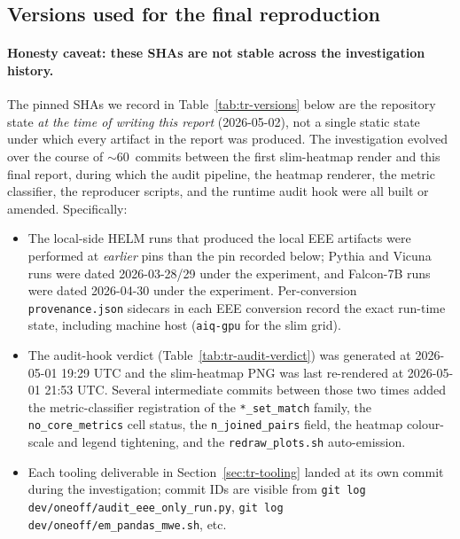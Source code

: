 \documentclass[11pt]{article}
\begin{document}
\subsection{Versions used for the final reproduction}
\label{sec:tr-versions}

\paragraph{Honesty caveat: these SHAs are not stable across the
  investigation history.}
The pinned SHAs we record in Table~\ref{tab:tr-versions} below are the
  repository state \emph{at the time of writing this report}
  (2026-05-02), not a single static state under which every artifact
  in the report was produced.
The investigation evolved over the course of $\sim 60$~commits
  between the first slim-heatmap render and this final report,
  during which the audit pipeline, the heatmap renderer, the metric
  classifier, the reproducer scripts, and the runtime audit hook
  were all built or amended.
Specifically:
\begin{itemize}
  \item The local-side HELM runs that produced the local EEE
        artifacts were performed at \emph{earlier} 
        pins than the pin recorded below; Pythia and Vicuna runs
        were dated 2026-03-28/29 under the
         experiment, and Falcon-7B runs
        were dated 2026-04-30 under the
         experiment.
        Per-conversion \texttt{provenance.json} sidecars in each EEE
        conversion record the exact run-time state, including
        machine host (\texttt{aiq-gpu} for the slim grid).
  \item The audit-hook verdict
        (Table~\ref{tab:tr-audit-verdict}) was generated at
        2026-05-01 19:29 UTC and the slim-heatmap PNG was last
        re-rendered at 2026-05-01 21:53 UTC.
        Several intermediate commits between those two times added
        the metric-classifier registration of the
        \texttt{*\_set\_match} family, the \texttt{no\_core\_metrics}
        cell status, the \texttt{n\_joined\_pairs} field, the
        heatmap colour-scale and legend tightening, and the
        \texttt{redraw\_plots.sh} auto-emission.
  \item Each tooling deliverable in
        Section~\ref{sec:tr-tooling} landed at its own commit during
        the investigation; commit IDs are visible from
        \texttt{git log dev/oneoff/audit\_eee\_only\_run.py},
        \texttt{git log dev/oneoff/em\_pandas\_mwe.sh}, etc.
\end{itemize}
\end{document}
